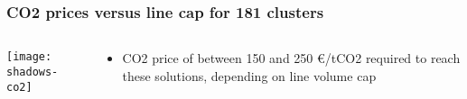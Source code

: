 \documentclass[10pt,aspectratio=169,dvipsnames]{beamer}
\let\olditem\item
\renewcommand{\item}{%
\olditem\vspace{5pt}}
\begin{document}
\begin{frame}
  \frametitle{CO2 prices versus line cap for 181 clusters}



\begin{columns}[T]
\begin{column}{10cm}
\centering
  \texttt{[image: shadows-co2]}
\end{column}
\begin{column}{4cm}
  \begin{itemize}
    \vspace{2cm}
  \item CO2 price of between 150 and 250 \euro/tCO2 required to reach these solutions, depending on line volume cap
  \end{itemize}
\end{column}
\end{columns}

\end{frame}









\end{document}
